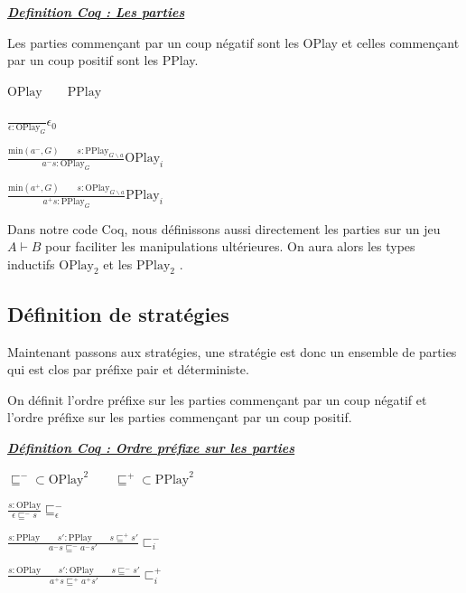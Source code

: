 \documentclass[a4paper,12pt]{article}
\renewenvironment{leftbar}{
  \def\FrameCommand{\vrule width 1pt \hspace{10pt}}
  \MakeFramed {\advance\hsize-\width \FrameRestore}
\setlength{\parskip}{10pt}}
 {\endMakeFramed}
\newenvironment{answer}[1]
{
  \vspace{0.5cm} \noindent \begin{minipage}{\linewidth}
    \textbf{\textit{\uline{#1}}}
    \begin{leftbar}
}
{
    \end{leftbar}\end{minipage}\vspace{0.2cm}
}
\begin{document}
\begin{answer}{Definition Coq : Les parties \href{https://ulysse_durand.gitlab.io/stagel3/Codecoq.theories.strategy.html\#O\_play}{\faCode}}
Les parties commençant par un coup négatif sont les OPlay
et celles commençant par un coup positif sont les PPlay.

$\text{OPlay} \qquad \text{PPlay}$

$\frac{}{\epsilon : \text{OPlay}_G}\epsilon_0$

$\frac{\text{min}(a^-,G) \qquad s : \text{PPlay}_{G\backslash a}}
{a^-s : \text{OPlay}_G}\text{OPlay}_i$

$\frac{\text{min}(a^+,G) \qquad s : \text{OPlay}_{G\backslash a}}
{a^+s : \text{PPlay}_G}\text{PPlay}_i$
\end{answer}

Dans notre code Coq, nous définissons aussi directement les parties sur un jeu
$A\vdash B$ pour faciliter les manipulations ultérieures. On aura alors les types
inductifs $\text{OPlay}_2$ et les $\text{PPlay}_2$ \href{https://ulysse_durand.gitlab.io/stagel3/Codecoq.theories.jeuthese.html\#O\_play2}{\faCode}.


\subsection{Définition de stratégies}



Maintenant passons aux stratégies, une stratégie est donc un ensemble de
parties qui est clos par préfixe pair et déterministe.

On définit l'ordre préfixe sur les parties commençant
par un coup négatif et l'ordre préfixe sur les parties commençant par un coup
positif.

\begin{answer}{Définition Coq : Ordre préfixe sur les parties \href{https://ulysse_durand.gitlab.io/stagel3/Codecoq.theories.strategy.html\#prefixO}{\faCode}}
$\sqsubseteq^- \subset \text{OPlay}^2 \qquad \sqsubseteq^+ \subset \text{PPlay}^2$

$\frac{s : \text{OPlay}}{\epsilon \sqsubseteq^- s} \sqsubseteq^-_\epsilon$

$\frac{s : \text{PPlay} \qquad s' : \text{PPlay} \qquad s \sqsubseteq^+ s'}
{a^-s \sqsubseteq^- a^-s'} \sqsubset^-_i$

$\frac{s : \text{OPlay} \qquad s' : \text{OPlay} \qquad s \sqsubseteq^- s'}
{a^+s \sqsubseteq^+ a^+s'} \sqsubset^+_i$
\end{answer}
\end{document}
